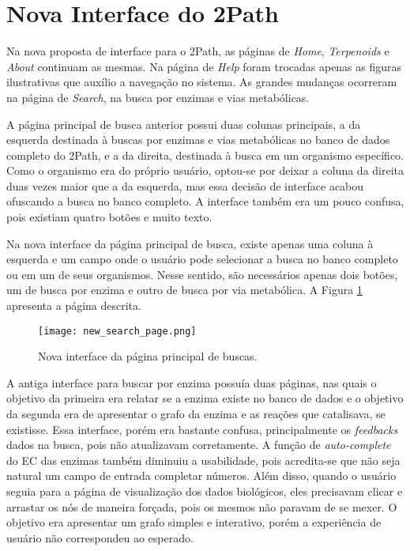  

\section{Nova Interface do 2Path} \label{novaInterface}

\indent Na nova proposta de interface para o 2Path, as páginas de \textit{Home}, \textit{Terpenoids} e \textit{About} continuam as mesmas. Na página de \textit{Help} foram trocadas apenas as figuras ilustrativas que auxílio a navegação no sistema. As grandes mudanças ocorreram na página de \textit{Search}, na busca por enzimas e vias metabólicas.

\indent A página principal de busca anterior possui duas colunas principais, a da esquerda destinada à buscas por enzimas e vias metabólicas no banco de dados completo do 2Path, e a da direita, destinada à busca em um organismo específico. Como o organismo era do próprio usuário, optou-se por deixar a coluna da direita duas vezes maior que a da esquerda, mas essa decisão de interface acabou ofuscando a busca no banco completo. A interface também era um pouco confusa, pois existiam quatro botões e muito texto.

\indent Na nova interface da página principal de busca, existe apenas uma coluna à esquerda e um campo onde o usuário pode selecionar a busca no banco completo ou em um de seus organismos. Nesse sentido, são necessários apenas dois botões, um de busca por enzima e outro de busca por via metabólica. A Figura \ref{fig:new_search_page} apresenta a página descrita.

\begin{figure}[!h]
    \centering
    \texttt{[image: new\_search\_page.png]}
    \caption{Nova interface da página principal de buscas.}
    \label{fig:new_search_page}
\end{figure}

\indent A antiga interface para buscar por enzima possuía duas páginas, nas quais o objetivo da primeira era relatar se a enzima existe no banco de dados e o objetivo da segunda era de apresentar o grafo da enzima e as reações que catalisava, se existisse. Essa interface, porém era bastante confusa, principalmente os \textit{feedbacks} dados na busca, pois não atualizavam corretamente. A função de \textit{auto-complete} do EC das enzimas também diminuiu a usabilidade, pois acredita-se que não seja natural um campo de entrada completar números. Além disso, quando o usuário seguia para a página de visualização dos dados biológicos, eles precisavam clicar e arrastar os nós de maneira forçada, pois os mesmos não paravam de se mexer. O objetivo era apresentar um grafo simples e interativo, porém a experiência de usuário não correspondeu ao esperado.

